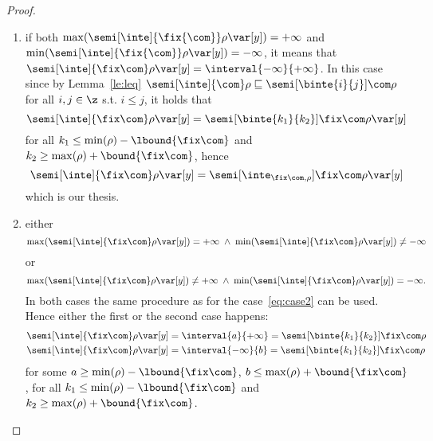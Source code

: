 \begin{proof}
\begin{enumerate}[label=(\roman*)]
  \item\label{eq:case2} if both
    \({\max(\semi[\inte]{\fix{\com}}\rho\var[y]) = +\infty}\) and
    \({\min(\semi[\inte]{\fix{\com}}\rho\var[y]) = -\infty}\), it
    means that
    \(\semi[\inte]{\fix\com}\rho\var[y] =
    \interval{-\infty}{+\infty}\). In this case since by
    Lemma~\ref{le:leq}
    \({\semi[\inte]{\com}\rho \sqsubseteq
      \semi[\binte{i}{j}]{\com}\rho}\) for all \(i, j \in \z\)
    s.t. \(i \leq j\), it holds that
    \begin{equation*}
      \semi[\inte]{\fix\com}\rho\var[y] = \semi[\binte{k_1}{k_2}]{\fix\com}\rho\var[y]
    \end{equation*}
    for all \(k_1 \leq \min(\rho) - \lbound{\fix\com}\) and
    \(k_2 \geq \max(\rho) + \bound{\fix\com}\), hence
    \begin{equation*}
      \semi[\inte]{\fix\com}\rho\var[y] = \semi[\inte_{\fix\com,\rho}]{\fix\com}\rho\var[y]
    \end{equation*}
    which is our thesis.
    
  \item either \[{\max(\semi[\inte]{\fix\com}\rho\var[y]) = + \infty} \; \land \;
    {\min(\semi[\inte]{\fix\com}\rho\var[y]) \neq -\infty}\] or
  \[{\max(\semi[\inte]{\fix\com}\rho\var[y]) \neq + \infty} \; \land
    \; {\min(\semi[\inte]{\fix\com}\rho\var[y]) = -\infty}.\] In both
  cases the same procedure as for the case~\ref{eq:case2} can be used.
  Hence either the first or the second case happens:
  \begin{align*}
    \semi[\inte]{\fix\com}\rho\var[y] & = \interval{a}{+\infty} = \semi[\binte{k_1}{k_2}]{\fix\com}\rho \\
    \semi[\inte]{\fix\com}\rho\var[y] & = \interval{-\infty}{b} = \semi[\binte{k_1}{k_2}]{\fix\com}\rho
  \end{align*}
  for some \(a\geq \min(\rho) - \lbound{\fix\com}\),
  \(b \leq \max(\rho) + \bound{\fix\com}\), for all
  \(k_1 \leq \min(\rho) - \lbound{\fix\com}\) and
  \(k_2 \geq \max(\rho) + \bound{\fix\com}\).


\end{enumerate}
\end{proof}
